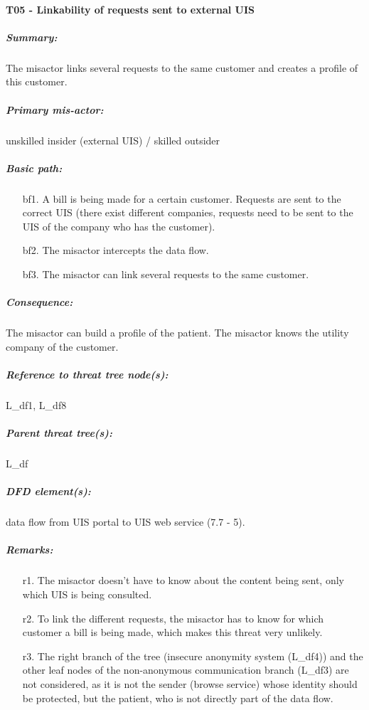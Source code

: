

\paragraph{T05 - Linkability of requests sent to external UIS}
\label{par:t06}
    \subparagraph{Summary:} The misactor links several requests to the same customer and creates a profile of this customer.
    \subparagraph{Primary mis-actor:} unskilled insider (external UIS) / skilled outsider
    \subparagraph{Basic path:}
    \begin{enumerate}
        \item[bf1.] A bill is being made for a certain customer. Requests are sent to the correct UIS (there exist
						different companies, requests need to be sent to the UIS of the company who has the customer).
        \item[bf2.] The misactor intercepts the data flow.
        \item[bf3.] The misactor can link several requests to the same customer.
    \end{enumerate}
    \subparagraph{Consequence:} The misactor can build a profile of the patient. The misactor knows the utility company of the customer.


    \subparagraph{Reference to threat tree node(s):} L\_df1, L\_df8
    \subparagraph{Parent threat tree(s):} L\_df
    \subparagraph{DFD element(s):} data flow from UIS portal to UIS web service (7.7 - 5).
    \subparagraph{Remarks:}
    \begin{enumerate}
        \item[r1.] The misactor doesn't have to know about the content being sent, only which UIS is being consulted.
        \item[r2.] To link the different requests, the misactor has to know for which customer a bill is being made, 
					which makes this threat very unlikely.
		\item[r3.] The right branch of the tree (insecure anonymity system (L\_df4)) and the other leaf nodes of
the non-anonymous communication branch (L\_df3) are not considered, as it is not the sender
(browse service) whose identity should be protected, but the patient, who is not directly part
of the data flow.
    \end{enumerate}



